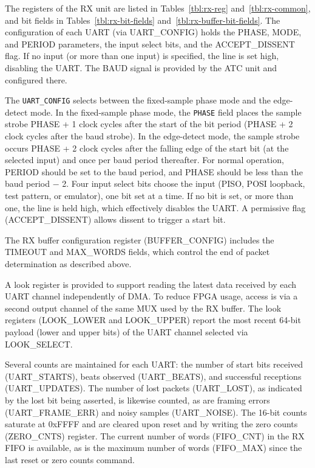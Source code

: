 \documentclass[12pt]{article}
\begin{document}
The registers of the RX unit are listed in Tables~\ref{tbl:rx-reg} and~\ref{tbl:rx-common}, and bit
fields in Tables~\ref{tbl:rx-bit-fields} and~\ref{tbl:rx-buffer-bit-fields}.  The configuration of each UART (via UART\_CONFIG) holds
the PHASE, MODE, and PERIOD parameters, the input select bits, and the ACCEPT\_DISSENT flag.  If no
input (or more than one input) is specified, the line is set high, disabling the UART.  The BAUD
signal is provided by the ATC unit and configured there.

The {\tt UART\_CONFIG} selects between the fixed-sample phase mode and the edge-detect mode.  In the
fixed-sample phase mode, the {\tt PHASE} field places the sample strobe PHASE + 1 clock cycles after
the start of the bit period (PHASE + 2 clock cycles after the baud strobe).  In the edge-detect
mode, the sample strobe occurs PHASE + 2 clock cycles after the falling edge of the start bit (at
the selected input) and once per baud period thereafter.  For normal operation, PERIOD should be set
to the baud period, and PHASE should be less than the baud period $-$ 2.  Four input select bits
choose the input (PISO, POSI loopback, test pattern, or emulator), one bit set at a time.  If no bit
is set, or more than one, the line is held high, which effectively disables the UART.  A permissive
flag (ACCEPT\_DISSENT) allows dissent to trigger a start bit.

The RX buffer configuration register (BUFFER\_CONFIG) includes the
TIMEOUT and MAX\_WORDS fields, which control the end of packet
determination as described above.

A look register is provided to support reading the latest data
received by each UART channel independently of DMA.  To reduce FPGA
usage, access is via a second output channel of the same MUX used by
the RX buffer.  The look registers (LOOK\_LOWER and LOOK\_UPPER)
report the most recent 64-bit payload (lower and upper bits) of the
UART channel selected via LOOK\_SELECT.

Several counts are maintained for each UART: the number of start bits
received (UART\_STARTS), beats observed (UART\_BEATS), and successful
receptions (UART\_UPDATES).  The number of lost packets (UART\_LOST),
as indicated by the lost bit being asserted, is likewise counted, as are
framing errors (UART\_FRAME\_ERR) and noisy samples (UART\_NOISE).
The 16-bit counts saturate at 0xFFFF and are cleared upon reset and by
writing the zero counts (ZERO\_CNTS) register.  The current number of
words (FIFO\_CNT) in the RX FIFO is available, as is the maximum number of words (FIFO\_MAX)
since the last reset or zero counts command.
\end{document}
